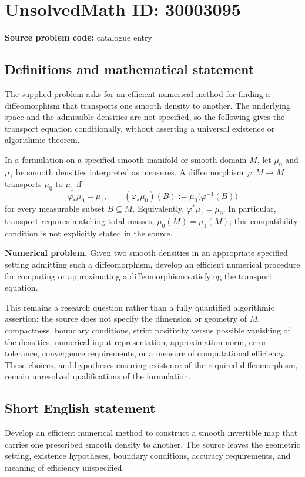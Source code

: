 \documentclass[11pt]{article}
\begin{document}
\section*{UnsolvedMath ID: 30003095}
\textbf{Source problem code:} catalogue entry
\subsection{Definitions and mathematical statement}
The supplied problem asks for an efficient numerical method for finding a diffeomorphism that transports one smooth density to another. The underlying space and the admissible densities are not specified, so the following gives the transport equation conditionally, without asserting a universal existence or algorithmic theorem.

In a formulation on a specified smooth manifold or smooth domain \(M\), let \(\mu_0\) and \(\mu_1\) be smooth densities interpreted as measures. A diffeomorphism \(\varphi\colon M\to M\) transports \(\mu_0\) to \(\mu_1\) if
\[
\varphi_*\mu_0=\mu_1,
\qquad
(\varphi_*\mu_0)(B):=\mu_0\bigl(\varphi^{-1}(B)\bigr)
\]
for every measurable subset \(B\subseteq M\). Equivalently, \(\varphi^*\mu_1=\mu_0\). In particular, transport requires matching total masses, \(\mu_0(M)=\mu_1(M)\); this compatibility condition is not explicitly stated in the source.

\textbf{Numerical problem.} Given two smooth densities in an appropriate specified setting admitting such a diffeomorphism, develop an efficient numerical procedure for computing or approximating a diffeomorphism satisfying the transport equation.

This remains a research question rather than a fully quantified algorithmic assertion: the source does not specify the dimension or geometry of \(M\), compactness, boundary conditions, strict positivity versus possible vanishing of the densities, numerical input representation, approximation norm, error tolerance, convergence requirements, or a measure of computational efficiency. These choices, and hypotheses ensuring existence of the required diffeomorphism, remain unresolved qualifications of the formulation.
\subsection{Short English statement}
Develop an efficient numerical method to construct a smooth invertible map that carries one prescribed smooth density to another. The source leaves the geometric setting, existence hypotheses, boundary conditions, accuracy requirements, and meaning of efficiency unspecified.
\end{document}
